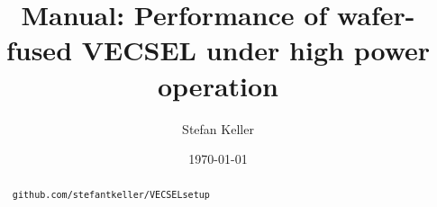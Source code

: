 \documentclass[11pt, a4paper, twoside]{article}
\title{Manual: Performance of wafer-fused VECSEL under high power operation}
\author{Stefan Keller}
\date{\today}
\newcommand{\code}[1]{\texttt{#1}}
\numberwithin{equation}{section} %
\numberwithin{table}{section}
\numberwithin{figure}{section}
\begin{document}
\maketitle
{}
\fancyhead[LO]{\leftmark}

\begin{abstract}
\code{github.com/stefantkeller/VECSELsetup}
\end{abstract}

\tableofcontents\newpage








\end{document}
